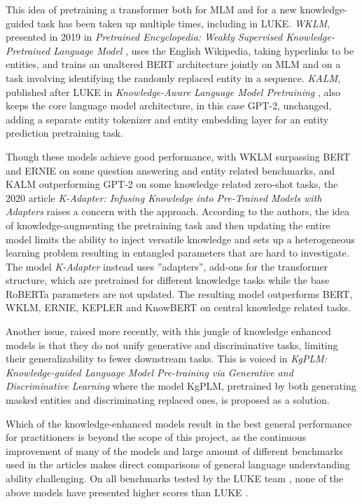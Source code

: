 \documentclass[main.tex]{subfiles}
\begin{document}
This idea of pretraining a transformer both for MLM and for a new knowledge-guided task has been taken up multiple times, including in LUKE.
\emph{WKLM}, presented in 2019 in \emph{Pretrained Encyclopedia: Weakly Supervised Knowledge-Pretrained Language Model} \cite{xiong2019wklm}, uses the English Wikipedia, taking hyperlinks to be entities, and trains an unaltered BERT architecture jointly on MLM and on a task involving identifying the randomly replaced entity in a sequence.
\emph{KALM}, published after LUKE in \emph{Knowledge-Aware Language Model Pretraining} \cite{corby2020kalm}, also keeps the core language model architecture, in this case GPT-2, unchanged, adding a separate entity tokenizer and entity embedding layer for an entity prediction pretraining task.

Though these models achieve good performance, with WKLM surpassing BERT and ERNIE on some question answering and entity related benchmarks, and KALM outperforming GPT-2 on some knowledge related zero-shot tasks, the 2020 article \emph{K-Adapter: Infusing Knowledge into Pre-Trained Models with Adapters} \cite{wang2020kadapter} raises a concern with the approach.
According to the authors, the idea of knowledge-augmenting the pretraining task and then updating the entire model limits the ability to inject versatile knowledge and sets up a heterogeneous learning problem resulting in entangled parameters that are hard to investigate.
The model \emph{K-Adapter} instead uses ''adapters'', add-ons for the transformer structure, which are pretrained for different knowledge tasks while the base RoBERTa parameters are not updated.
The resulting model outperforms BERT, WKLM, ERNIE, KEPLER and KnowBERT on central knowledge related tasks.

Another issue, raised more recently, with this jungle of knowledge enhanced models is that they do not unify generative and discriminative tasks, limiting their generalizability to fewer downstream tasks.
This is voiced in \emph{KgPLM: Knowledge-guided Language Model Pre-training via Generative and Discriminative Learning} \cite{he2020kgplm} where the model KgPLM, pretrained by both generating masked entities and discriminating replaced ones, is proposed as a solution.

Which of the knowledge-enhanced models result in the best general performance for practitioners is beyond the scope of this project, as the continuous improvement of many of the models and large amount of different benchmarks used in the articles makes direct comparisons of general language understanding ability challenging.
On all benchmarks tested by the LUKE team \cite{yamada2020luke}, none of the above models have presented higher scores than LUKE \cite[Sec. 4]{yamada2020luke}.
\end{document}
